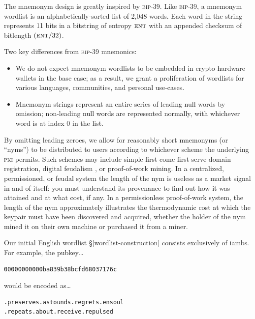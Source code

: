\documentclass[twoside]{article}
\begin{document}
The mnemonym design is greatly inspired by \textsc{bip}-39. Like
\textsc{bip}-39, a mnemonym wordlist is an alphabetically-sorted list
of 2,048 words. Each word in the string represents 11 bits in a
bitstring of entropy $\textsc{ent}$ with an appended checksum of
bitlength $(\textsc{ent}/32)$.

Two key differences from \textsc{bip}-39 mnemonics:

\begin{itemize}[noitemsep,topsep=2pt]

\item
  We do not expect mnemonym wordlists to be embedded in crypto hardware
  wallets in the base case; as a result, we grant a proliferation of
  wordlists for various languages, communities, and personal
  use-cases.
\item
  Mnemonym strings represent an entire series of leading null words by
  omission; non-leading null words are represented normally, with
  whichever word is at index 0 in the list.
\end{itemize}

By omitting leading zeroes, we allow for reasonably short mnemonyms (or
``nyms'') to be distributed to users according to whichever scheme the
underlying \textsc{pki} permits. Such schemes may include simple
first-come-first-serve domain registration, digital
feudalism \citep{YarvinSpecIntro}, or proof-of-work
mining. In a centralized, permissioned, or feudal system the length
of the nym is useless as a market signal in and of itself: you must
understand its provenance to find out how it was attained and at what cost,
if any. In a permissionless proof-of-work system, the length of the nym
approximately illustrates the thermodynamic cost at which the keypair
must have been discovered and acquired, whether the holder of the nym
mined it on their own machine or purchased it from a miner.

Our initial English wordlist \S\ref{wordlist-construction} consists
exclusively of iambs. For example, the pubkey\ldots{}

\begin{lstlisting}[style=listingcode]
00000000000ba839b38bcfd68037176c
\end{lstlisting}

\noindent
would be encoded as\ldots{}

\begin{lstlisting}[style=listingcode]
.preserves.astounds.regrets.ensoul
.repeats.about.receive.repulsed
\end{lstlisting}
\end{document}
